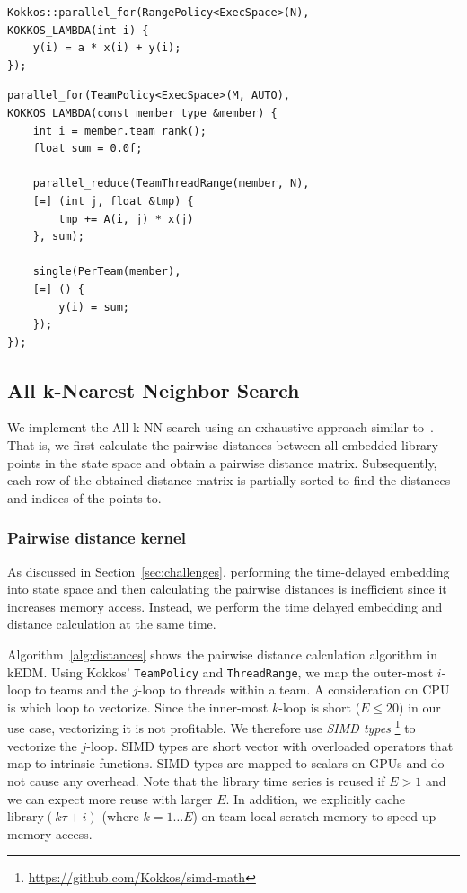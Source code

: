 \documentclass[sigconf]{acmart}
\begin{document}
\begin{lstlisting}[caption={Basic data parallel loop},label={lst:basic},float]
Kokkos::parallel_for(RangePolicy<ExecSpace>(N),
KOKKOS_LAMBDA(int i) {
    y(i) = a * x(i) + y(i);
});
\end{lstlisting}

\begin{lstlisting}[caption={Hierarchical data parallel loop},label={lst:hierarchical},float]
parallel_for(TeamPolicy<ExecSpace>(M, AUTO),
KOKKOS_LAMBDA(const member_type &member) {
    int i = member.team_rank();
    float sum = 0.0f;

    parallel_reduce(TeamThreadRange(member, N),
    [=] (int j, float &tmp) {
        tmp += A(i, j) * x(j)
    }, sum);

    single(PerTeam(member),
    [=] () {
        y(i) = sum;
    });
});
\end{lstlisting}

\subsection{All k-Nearest Neighbor Search}

We implement the All k-NN search using an exhaustive approach similar
to~\cite{Garcia2008,Garcia2010}. That is, we first calculate the pairwise
distances between all embedded library points in the state space and obtain a
pairwise distance matrix. Subsequently, each row of the obtained distance
matrix is partially sorted to find the distances and indices of the points to.

\subsubsection{Pairwise distance kernel}
As discussed in Section~\ref{sec:challenges}, performing the time-delayed
embedding into state space and then calculating the pairwise distances is
inefficient since it increases memory access. Instead, we perform the time
delayed embedding and distance calculation at the same time.

Algorithm~\ref{alg:distances} shows the pairwise distance calculation
algorithm in kEDM\@. Using Kokkos' \texttt{TeamPolicy} and
\texttt{ThreadRange}, we map the outer-most $i$-loop to teams and the $j$-loop to
threads within a team. A consideration on CPU is which loop to vectorize.
Since the inner-most $k$-loop is short ($E \leq 20$) in our use case,
vectorizing it is not profitable. We therefore use \textit{SIMD types}
\footnote{\url{https://github.com/Kokkos/simd-math}} to vectorize the
$j$-loop. SIMD types are short vector with overloaded operators that map to
intrinsic functions. SIMD types are mapped to scalars on GPUs and do not cause
any overhead.
Note that the library time series is reused if $E > 1$ and we can expect
more reuse with larger $E$. In addition, we explicitly cache $\mathrm{library}
(k \tau + i)$ (where $k=1 \dots E$) on team-local scratch memory to speed up
memory access.
\end{document}
